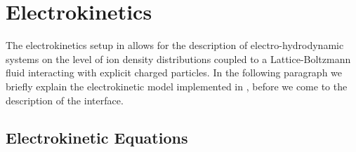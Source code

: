 \newcommand{\lb}{l_\mathrm{B}}
\newcommand{\kT}{k_\mathrm{B}T}

\chapter{\label{sec:electrokinetics}Electrokinetics}

The electrokinetics setup in \es{} allows for the description of electro-hydrodynamic
systems on the level of ion density distributions coupled to a Lattice-Boltzmann 
fluid interacting with explicit charged particles. In the following paragraph we 
briefly explain the electrokinetic model implemented in \es{}, before we come to
the description of the interface.

\section{Electrokinetic Equations}


